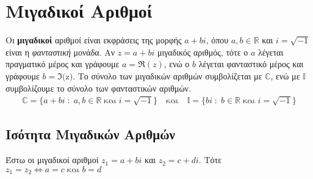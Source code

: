 \documentclass[a4paper,table]{report}
\begin{document}
\chapter*{Μιγαδικοί Αριθμοί}


Οι \textbf{μιγαδικοί} αριθμοί είναι εκφράσεις της μορφής $ a+bi $, 
όπου $ a,b \in \mathbb{R} $ και $ i= \sqrt{-1} $ είναι η \textit{φανταστική} μονάδα. 
Αν $ z=a+bi $ μιγαδικός αριθμός, τότε ο $a$ λέγεται 
\textcolor{Col1}{πραγματικό μέρος} και γράφουμε $ a = \Re(z) $, 
ενώ ο $b$ λέγεται \textcolor{Col1}{φανταστικό μέρος} και γράφουμε $b=\Im($z$)$. 
Το σύνολο των μιγαδικών αριθμών συμβολίζεται με $ \mathbb{C} $, ενώ με $ \mathbb{I} $ 
συμβολίζουμε το σύνολο των φανταστικών αριθμών.
\begin{align*}
  \mathbb{C} = \{ a+bi \; : \; a,b \in \mathbb{R} \; 
  \text{και} \; i = \sqrt{-1} \} \quad 
  \text{και} \quad \mathbb{I} = \{ bi \; : \; b \in \mathbb{R} 
  \; \text{και} \; i = \sqrt{-1} \}  
\end{align*}

\section*{Ισότητα Μιγαδικών Αριθμών}

\begin{mybox1}
  \begin{dfn}
    Έστω οι μιγαδικοί αριθμοί $ z_{1}=a+bi $ και $ z_{2}=c+di $. Τότε 
    $
    z_{1} = z_{2} \Leftrightarrow a=c \; \text{και} \; b=d 
    $
  \end{dfn}
\end{mybox1}
\end{document}
